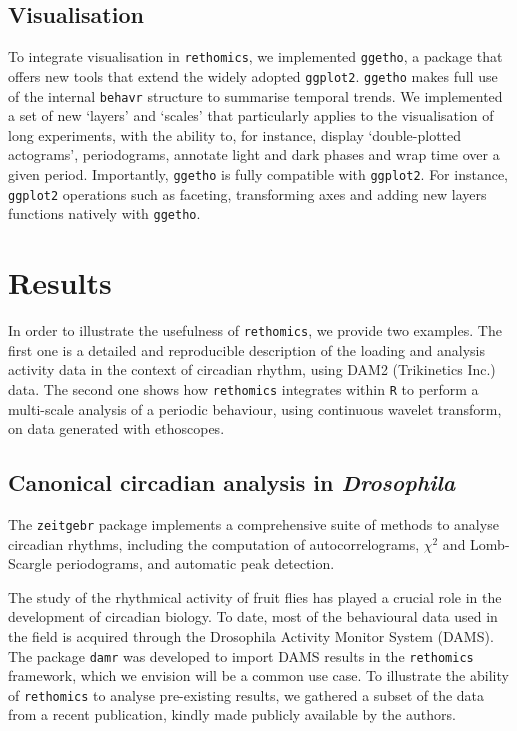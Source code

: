 \documentclass[10pt,letterpaper]{article}\usepackage[]{graphicx}\usepackage[]{color}
\begin{document}
\subsection*{Visualisation}

To integrate visualisation in \texttt{rethomics}, we implemented \texttt{ggetho},
a package that offers new tools that extend the widely adopted \texttt{ggplot2}\cite{wickham_ggplot2_2016}.
\texttt{ggetho} makes full use of the internal \texttt{behavr} structure to summarise temporal trends.
We implemented a set of new `layers' and `scales' that particularly applies to the visualisation of long experiments, with the ability to, for instance, display `double-plotted actograms', periodograms, annotate light and dark phases and wrap time over a given period. 
Importantly, \texttt{ggetho} is fully compatible with \texttt{ggplot2}. 
For instance, \texttt{ggplot2} operations such as faceting, transforming axes and adding new layers functions natively with \texttt{ggetho}.




\section*{Results}

In order to illustrate the usefulness of \texttt{rethomics}, we provide two examples.
The first one is a detailed and reproducible description of the loading and analysis activity data in the context of circadian rhythm, using DAM2 (Trikinetics Inc.) data.
The second one shows how \texttt{rethomics} integrates within \texttt{R} to perform a multi-scale analysis of a periodic behaviour, using continuous wavelet transform, on data generated with ethoscopes\cite{geissmann_ethoscopes_2017}.

\subsection*{Canonical circadian analysis in \emph{Drosophila}}
The \texttt{zeitgebr} package implements a comprehensive suite of methods to analyse circadian rhythms, 
including the computation of autocorrelograms, $\chi{}^2$\cite{sokolove_chi_1978} and Lomb-Scargle\cite{ruf_lomb-scargle_1999} periodograms,
and automatic peak detection.

The study of the rhythmical activity of fruit flies has played a crucial role in the development of circadian biology\cite{dubowy_circadian_2017}.
To date, most of the behavioural data used in the field is acquired through the Drosophila Activity Monitor System (DAMS).
The package \texttt{damr} was developed to import DAMS results in the \texttt{rethomics} framework, which we envision will be a common use case. 
To illustrate the ability of \texttt{rethomics} to analyse pre-existing results,
we gathered a subset of the data from a recent publication\cite{buhl_quasimodo_2016}, kindly made publicly available by the authors\cite{ogueta_maite_2018_1172980}.
\end{document}
